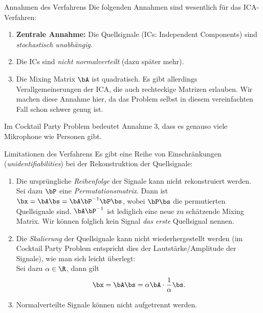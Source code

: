 \begin{frame}{Annahmen des Verfahrens}{}
	Die folgenden Annahmen sind wesentlich für das ICA-Verfahren:

	\begin{enumerate}
		\item \textbf{Zentrale Annahme:} Die Quellsignale (ICs: Independent Components) sind
			\textit{stochastisch unabhängig}.
		\item Die ICs sind \textit{nicht normalverteilt} (dazu später mehr).
		\item Die Mixing Matrix $\bA$ ist quadratisch. Es gibt allerdings Verallgemeinerungen der ICA,
			die auch rechteckige Matrizen erlauben. Wir machen diese Annahme hier,
			da das Problem selbst in diesem vereinfachten Fall schon schwer genug ist.
	\end{enumerate}
	
	Im Cocktail Party Problem bedeutet Annahme 3, dass es genauso viele Mikrophone wie Personen gibt.
\end{frame}


\begin{frame}{Limitationen des Verfahrens}{}
	Es gibt eine Reihe von Einschränkungen (\textit{unidentifiabilities}) bei der Rekonstruktion der Quellsignale:

	\begin{enumerate}
		\item Die ursprüngliche \textit{Reihenfolge} der Signale kann nicht rekonstruiert werden.
			Sei dazu $\bP$ eine \textit{Permutationsmatrix}. Dann ist
			$\bx = \bA \bs = \bA \bP^{-1} \bP \bs$, wobei $\bP \bs$ die permutierten Quellsignale sind.
			$\bA \bP^{-1}$ ist lediglich eine neue zu schätzende Mixing Matrix.
			Wir können folglich kein Signal \textit{das erste} Quellsignal nennen.
		\item Die \textit{Skalierung} der Quellsignale kann nicht wiederhergestellt werden
			(im Cocktail Party Problem entspricht dies der Lautstärke/Amplitude der Signale), wie man sich leicht überlegt: \\
			Sei dazu $\alpha \in \R$, dann gilt $$\bx = \bA \bs = \alpha \bA \cdot \frac{1}{\alpha} \bs.$$
		\item Normalverteilte Signale können nicht aufgetrennt werden.
	\end{enumerate}
\end{frame}


